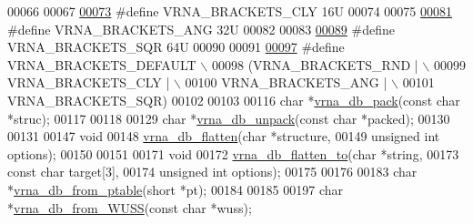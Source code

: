 \begin{DoxyCode}
00066 
00067 
\hyperlink{group__struct__utils__dot__bracket_gaf41be40e79cb756c4e0bb8edb4d803d2}{00073} \textcolor{preprocessor}{#define VRNA\_BRACKETS\_CLY      16U}
00074 
00075 
\hyperlink{group__struct__utils__dot__bracket_ga863e03f7f73f10fc9bbcbefbdda4bec8}{00081} \textcolor{preprocessor}{#define VRNA\_BRACKETS\_ANG      32U}
00082 
00083 
\hyperlink{group__struct__utils__dot__bracket_ga60525d61d7496eeea490a37f3d6bf757}{00089} \textcolor{preprocessor}{#define VRNA\_BRACKETS\_SQR      64U}
00090 
00091 
\hyperlink{group__struct__utils__dot__bracket_ga559ebf76b1b289f85309f4206e99aa1a}{00097} \textcolor{preprocessor}{#define VRNA\_BRACKETS\_DEFAULT  \(\backslash\)}
00098 \textcolor{preprocessor}{  (VRNA\_BRACKETS\_RND | \(\backslash\)}
00099 \textcolor{preprocessor}{   VRNA\_BRACKETS\_CLY | \(\backslash\)}
00100 \textcolor{preprocessor}{   VRNA\_BRACKETS\_ANG | \(\backslash\)}
00101 \textcolor{preprocessor}{   VRNA\_BRACKETS\_SQR)}
00102 
00103 
00116 \textcolor{keywordtype}{char} *\hyperlink{group__struct__utils__dot__bracket_ga55c4783060a1464f862f858d5599c9e1}{vrna\_db\_pack}(\textcolor{keyword}{const} \textcolor{keywordtype}{char} *struc);
00117 
00118 
00129 \textcolor{keywordtype}{char} *\hyperlink{group__struct__utils__dot__bracket_ga6490adff857d84ce06e6f379ae3a4512}{vrna\_db\_unpack}(\textcolor{keyword}{const} \textcolor{keywordtype}{char} *packed);
00130 
00131 
00147 \textcolor{keywordtype}{void}
00148 \hyperlink{group__struct__utils__dot__bracket_gae966b9f44168a4f4b39ca42ffb5f37b7}{vrna\_db\_flatten}(\textcolor{keywordtype}{char}          *structure,
00149                 \textcolor{keywordtype}{unsigned} \textcolor{keywordtype}{int}  options);
00150 
00151 
00171 \textcolor{keywordtype}{void}
00172 \hyperlink{group__struct__utils__dot__bracket_ga690425199c8b71545e7196e3af1436f8}{vrna\_db\_flatten\_to}(\textcolor{keywordtype}{char}         *\textcolor{keywordtype}{string},
00173                    \textcolor{keyword}{const} \textcolor{keywordtype}{char}   target[3],
00174                    \textcolor{keywordtype}{unsigned} \textcolor{keywordtype}{int} options);
00175 
00176 
00183 \textcolor{keywordtype}{char} *\hyperlink{group__struct__utils__dot__bracket_gaf9ecd0d7877fecdbb0292e24f40283d5}{vrna\_db\_from\_ptable}(\textcolor{keywordtype}{short} *pt);
00184 
00185 
00197 \textcolor{keywordtype}{char} *\hyperlink{group__struct__utils__dot__bracket_ga02ca70cffb2d864f7b2d95d92218bae0}{vrna\_db\_from\_WUSS}(\textcolor{keyword}{const} \textcolor{keywordtype}{char} *wuss);

\end{DoxyCode}
